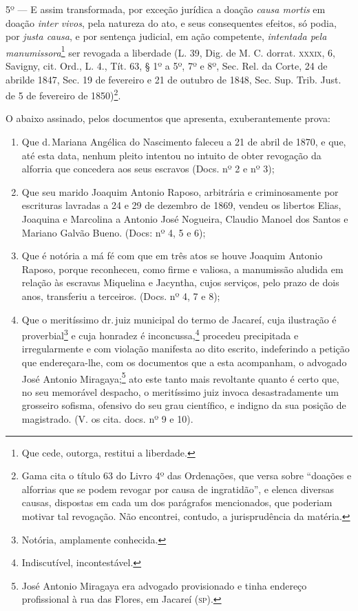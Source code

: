 5º --- E assim transformada, por exceção jurídica a doação \emph{causa
mortis} em doação \emph{inter vivos}, pela natureza do ato, e seus
consequentes efeitos, só podia, por \emph{justa causa}, e por sentença
judicial, em ação competente, \emph{intentada pela
manumissora}\footnote{ Que cede, outorga, restitui a liberdade.} ser
revogada a liberdade (L. 39, Dig. de M. C. dorrat. \textsc{xxxix}, 6, Savigny,
cit. Ord., L. 4., Tít. 63, § 1º a 5º, 7º e 8º, Sec. Rel. da Corte, 24 de
abrilde 1847, Sec. 19 de fevereiro e 21 de outubro de 1848, Sec. Sup.
Trib. Just. de 5 de fevereiro de 1850)\footnote{ Gama cita o título 63
  do Livro 4º das Ordenações, que versa sobre ``doações e alforrias
  que se podem revogar por causa de ingratidão'', e elenca diversas
  causas, dispostas em cada um dos parágrafos mencionados, que poderiam
  motivar tal revogação. Não encontrei, contudo, a jurisprudência da
  matéria.}.

O abaixo assinado, pelos documentos que apresenta, exuberantemente
prova:

\begin{enumerate}[label=\arabic*º]
\item Que d.\,Mariana Angélica do Nascimento faleceu a 21 de abril de
1870, e que, até esta data, nenhum pleito intentou no intuito de obter
revogação da alforria que concedera aos seus escravos (Docs. nº 2 e nº
3);

\item Que seu marido Joaquim Antonio Raposo, arbitrária e criminosamente
por escrituras lavradas a 24 e 29 de dezembro de 1869, vendeu os
libertos Elias, Joaquina e Marcolina a Antonio José Nogueira, Claudio
Manoel dos Santos e Mariano Galvão Bueno. (Docs: nº 4, 5 e 6);

\item Que é notória a má fé com que em três atos se houve Joaquim
Antonio Raposo, porque reconheceu, como firme e valiosa, a manumissão
aludida em relação às escravas Miquelina e Jacyntha, cujos serviços,
pelo prazo de dois anos, transferiu a terceiros. (Docs. nº 4, 7 e 8);

\item Que o meritíssimo dr.\,juiz municipal do termo de Jacareí, cuja
ilustração é proverbial\footnote{ Notória, amplamente conhecida.} e
cuja honradez é inconcussa,\footnote{ Indiscutível, incontestável.}
procedeu precipitada e irregularmente e com violação manifesta ao dito
escrito, indeferindo a petição que endereçara-lhe, com os documentos que
a esta acompanham, o advogado José Antonio Miragaya;\footnote{ José
  Antonio Miragaya era advogado provisionado e tinha endereço
  profissional à rua das Flores, em Jacareí (\textsc{sp}).} ato este tanto mais
revoltante quanto é certo que, no seu memorável despacho, o meritíssimo
juiz invoca desastradamente um grosseiro sofisma, ofensivo do seu grau
científico, e indigno da sua posição de magistrado. (V. os cita. docs.
nº 9 e 10).
\end{enumerate}


